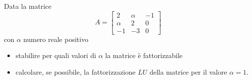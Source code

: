Data la matrice
\[
A=\left[
\begin{array}{ccc}
2 & \alpha & -1 \\
\alpha & 2 & 0\\
-1 & -3 & 0
\end{array}\right]
\]
 con $\alpha$ numero reale positivo
 \begin {itemize}
 \item stabilire per quali valori di $\alpha$ la matrice \`{e}
 fattorizzabile
 \item calcolare, se possibile, la fattorizzazione $LU$ della matrice
  per il valore $\alpha=1$.
\end{itemize}
